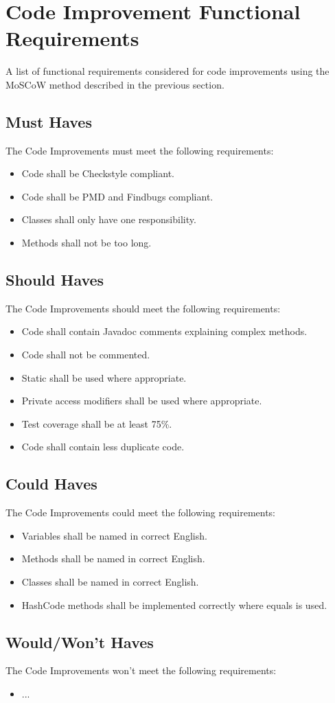 \documentclass[10pt]{article}
\begin{document}
\section*{Code Improvement Functional Requirements}

A list of functional requirements considered for code improvements using the MoSCoW method described in the previous section.

\subsection*{Must Haves}
The Code Improvements must meet the following requirements:
\begin{itemize}
	\item Code shall be Checkstyle compliant.
	\item Code shall be PMD and Findbugs compliant.
	\item Classes shall only have one responsibility.
	\item Methods shall not be too long.
\end{itemize}

\subsection*{Should Haves}
The Code Improvements should meet the following requirements:
\begin{itemize}
	\item Code shall contain Javadoc comments explaining complex methods.
	\item Code shall not be commented.
	\item Static shall be used where appropriate.
	\item Private access modifiers shall be used where appropriate.
	\item Test coverage shall be at least 75\%.
	\item Code shall contain less duplicate code.
\end{itemize}

\subsection*{Could Haves}
The Code Improvements could meet the following requirements:
\begin{itemize}
	\item Variables shall be named in correct English.
	\item Methods shall be named in correct English.
	\item Classes shall be named in correct English.
	\item HashCode methods shall be implemented correctly where equals is used.
\end{itemize}

\subsection*{Would/Won't Haves}
The Code Improvements won't meet the following requirements:
\begin{itemize}
	\item ...
\end{itemize}
\end{document}
